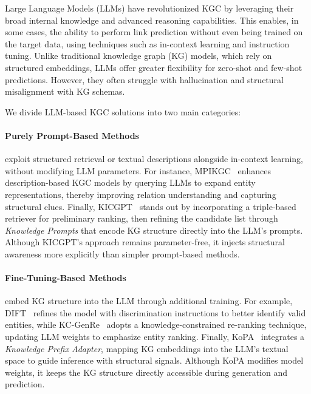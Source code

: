 \documentclass[12pt,a4paper]{article}
\begin{document}

Large Language Models (LLMs) have revolutionized KGC by leveraging their broad internal knowledge and advanced reasoning capabilities.
This enables, in some cases, the ability to perform link prediction without even being trained on the target data, using techniques such as in-context learning and instruction tuning.
Unlike traditional knowledge graph (KG) models, which rely on structured embeddings, LLMs offer greater flexibility for zero-shot and few-shot predictions.
However, they often struggle with hallucination and structural misalignment with KG schemas.


We divide LLM-based KGC solutions into two main categories:

\paragraph{Purely Prompt-Based Methods} exploit structured retrieval or textual descriptions alongside in-context learning, without modifying LLM parameters.
For instance, MPIKGC~\cite{xu2024mpikgc} enhances description-based KGC models by querying LLMs to expand entity representations, thereby improving relation understanding and capturing structural clues.
Finally, KICGPT~\cite{wei2023kicgpt} stands out by incorporating a triple-based retriever for preliminary ranking, then refining the candidate list through \emph{Knowledge Prompts} that encode KG structure directly into the LLM's prompts.
Although KICGPT's approach remains parameter-free, it injects structural awareness more explicitly than simpler prompt-based methods.

\paragraph{Fine-Tuning-Based Methods} embed KG structure into the LLM through additional training.
For example, DIFT~\cite{liu2024dift} refines the model with discrimination instructions to better identify valid entities, while KC-GenRe~\cite{wang2024kcgenre} adopts a knowledge-constrained re-ranking technique, updating LLM weights to emphasize entity ranking.
Finally, KoPA~\cite{qin2023kopa} integrates a \emph{Knowledge Prefix Adapter}, mapping KG embeddings into the LLM's textual space to guide inference with structural signals.
Although KoPA modifies model weights, it keeps the KG structure directly accessible during generation and prediction.
\end{document}
